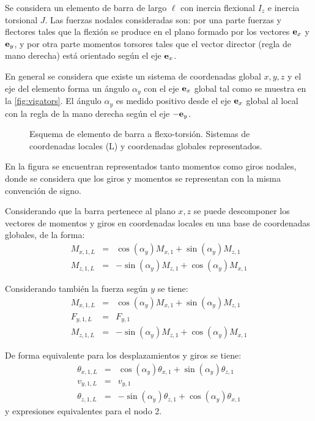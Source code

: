 Se considera un elemento de barra de largo $\ell$ con inercia flexional $I_z$ e inercia torsional $J$. %
%
Las fuerzas nodales consideradas son: por una parte fuerzas y flectores tales que la flexión se produce en el plano formado por los vectores ${\bf e}_x$ y ${\bf e}_y$, y por otra parte momentos torsores tales que el vector director (regla de mano derecha) está orientado según el eje ${\bf e}_x$. %


En general se considera que existe un sistema de coordenadas global  $x,y,z$ y el eje del elemento forma un ángulo $\alpha_y$ con el eje ${\bf e}_x$ global tal como se muestra en la \autoref{fig:vigators}. %
El ángulo $\alpha_y$ es medido positivo desde el eje ${\bf e}_x$ global al local con la regla de la mano derecha según el eje $-{\bf e}_y$.


\begin{figure}[htb]
	\centering
  \def\svgwidth{1\textwidth}
  
  \caption{Esquema de elemento de barra a flexo-torsión. Sistemas de coordenadas locales (L) y coordenadas globales representados.}
  \label{fig:vigators}
\end{figure}


En la figura se encuentran representados tanto momentos como giros nodales, donde se considera que los giros y momentos se representan con la misma convención de signo. %
%

Considerando que la barra pertenece al plano $x,z$ se puede descomponer los vectores de momentos y giros en coordenadas locales en una base de coordenadas globales, de la forma:
%
\begin{eqnarray}
M_{x,1,L} &=& \cos(\alpha_y) M_{x,1} + \sin(\alpha_y) M_{z,1} \\
M_{z,1,L} &=& - \sin(\alpha_y) M_{z,1} + \cos(\alpha_y) M_{x,1}
\end{eqnarray}

Considerando también la fuerza según $y$ se tiene:
\begin{eqnarray}
M_{x,1,L} &=& \cos(\alpha_y) M_{x,1} + \sin(\alpha_y) M_{z,1} \\
F_{y,1,L} &=& F_{y,1} \\
M_{z,1,L} &=& - \sin(\alpha_y) M_{z,1} + \cos(\alpha_y) M_{x,1}
\end{eqnarray}

De forma equivalente para los desplazamientos y giros se tiene:
\begin{eqnarray}
\theta_{x,1,L} &=& \cos(\alpha_y) \theta_{x,1} + \sin(\alpha_y) \theta_{z,1} \\
v_{y,1,L} &=& v_{y,1} \\
\theta_{z,1,L} &=& - \sin(\alpha_y) \theta_{z,1} + \cos(\alpha_y) \theta_{x,1}
\end{eqnarray}
%
y expresiones equivalentes para el nodo 2.

